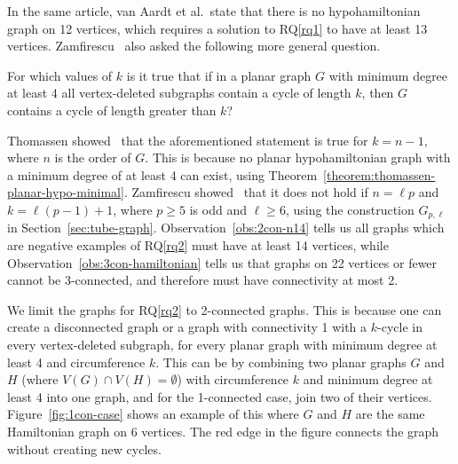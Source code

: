 In the same article, van Aardt et al.\ state that there is no hypohamiltonian graph on 12 vertices, which requires a solution to RQ\ref{rq1} to have at least 13 vertices. Zamfirescu~\cite{article:zamfirescu} also asked the following more general question.

\begin{researchquestion}
\label{rq2}
For which values of $k$ is it true that if in a planar graph $G$ with minimum degree at least $4$ all vertex-deleted subgraphs contain a cycle of length $k$, then $G$ contains a cycle of length greater than $k$?
~\cite{article:zamfirescu}
\end{researchquestion}

Thomassen showed~\cite{article:thomassen} that the aforementioned statement is true for $k = n - 1$, where $n$ is the order of $G$. This is because no planar hypohamiltonian graph with a minimum degree of at least 4 can exist, using Theorem~\ref{theorem:thomassen-planar-hypo-minimal}. Zamfirescu showed~\cite{article:zamfirescu} that it does not hold if $n = \ell p$ and $k = \ell (p - 1) + 1$, where $p \ge 5$ is odd and $\ell \ge 6$, using the construction $G_{p,\ell}$ in Section~\ref{sec:tube-graph}. Observation~\ref{obs:2con-n14} tells us all graphs which are negative examples of RQ\ref{rq2} must have at least 14 vertices, while Observation~\ref{obs:3con-hamiltonian} tells us that graphs on 22 vertices or fewer cannot be 3-connected, and therefore must have connectivity at most 2.

We limit the graphs for RQ\ref{rq2} to 2-connected graphs. This is because one can create a disconnected graph or a graph with connectivity 1 with a $k$-cycle in every vertex-deleted subgraph, for every planar graph with minimum degree at least 4 and circumference $k$. This can be by combining two planar graphs $G$ and $H$ (where $V(G) \cap V(H) = \emptyset$) with circumference $k$ and minimum degree at least 4 into one graph, and for the 1-connected case, join two of their vertices. Figure~\ref{fig:1con-case} shows an example of this where $G$ and $H$ are the same Hamiltonian graph on 6 vertices. The red edge in the figure connects the graph without creating new cycles.

